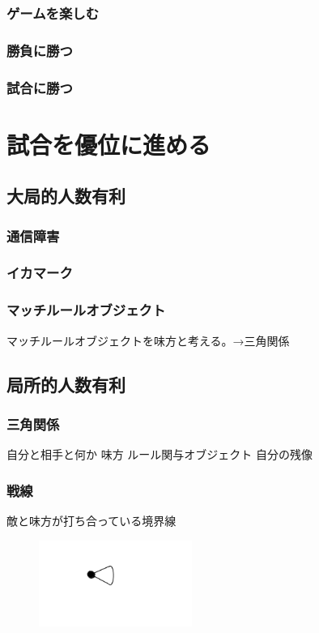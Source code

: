 \documentclass[a4paper,11pt]{jsbook}
\begin{document}
\section{ゲームを楽しむ}


\section{勝負に勝つ}


\section{試合に勝つ}





\part{試合を優位に進める}
\chapter{大局的人数有利}
\section{通信障害}
\section{イカマーク}
\section{マッチルールオブジェクト}
マッチルールオブジェクトを味方と考える。→三角関係

\chapter{局所的人数有利}
\section{三角関係}
自分と相手と何か
味方
ルール関与オブジェクト
自分の残像



\section{戦線}
敵と味方が打ち合っている境界線
\begin{figure}
  \begin{center}
    \includegraphics[width=5cm]{resoource/player.png}
  \end{center}
\end{figure}
\end{document}
